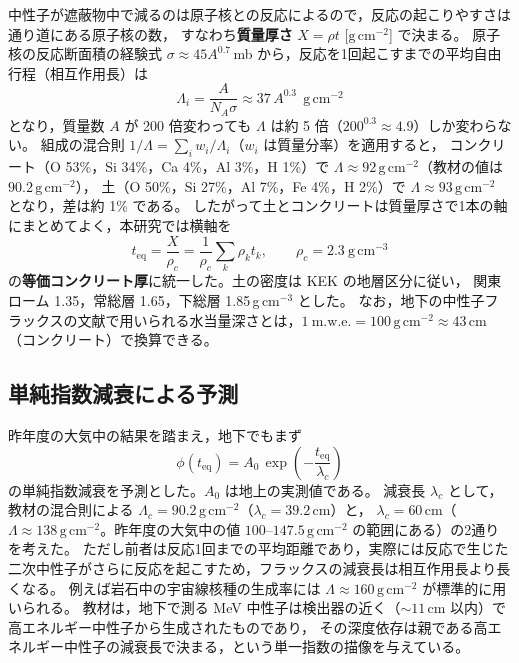 \documentclass[a4paper,11pt]{ltjsarticle}
\newcommand{\teq}{t_{\mathrm{eq}}}
\newcommand{\gcm}{\mathrm{g\,cm^{-2}}}
\begin{document}
中性子が遮蔽物中で減るのは原子核との反応によるので，反応の起こりやすさは通り道にある原子核の数，
すなわち\textbf{質量厚さ} $X=\rho t$ [$\gcm$] で決まる。
原子核の反応断面積の経験式 $\sigma\approx45A^{0.7}$\,mb から，反応を1回起こすまでの平均自由行程（相互作用長）は
\begin{equation}
  \Lambda_i = \frac{A}{N_A\sigma} \approx 37\,A^{0.3}\ \ \gcm
\end{equation}
となり，質量数 $A$ が 200 倍変わっても $\Lambda$ は約 5 倍（$200^{0.3}\approx4.9$）しか変わらない\cite{kyozai}。
組成の混合則 $1/\Lambda=\sum_i w_i/\Lambda_i$（$w_i$ は質量分率）を適用すると，
コンクリート（O 53\%，Si 34\%，Ca 4\%，Al 3\%，H 1\%）で $\Lambda\approx92\,\gcm$（教材の値は $90.2\,\gcm$），
土（O 50\%，Si 27\%，Al 7\%，Fe 4\%，H 2\%）で $\Lambda\approx93\,\gcm$ となり，差は約 1\% である。
したがって土とコンクリートは質量厚さで1本の軸にまとめてよく，本研究では横軸を
\begin{equation}
  \teq = \frac{X}{\rho_c} = \frac{1}{\rho_c}\sum_{k}\rho_k t_k,
  \qquad \rho_c = 2.3\ \mathrm{g\,cm^{-3}}
  \label{eq:teq}
\end{equation}
の\textbf{等価コンクリート厚}に統一した。土の密度は KEK の地層区分に従い，
関東ローム 1.35，常総層 1.65，下総層 1.85\,g\,cm$^{-3}$ とした。
なお，地下の中性子フラックスの文献\cite{FabrykaMartin1988}で用いられる水当量深さとは，$1\ \mathrm{m.w.e.}=100\,\gcm\approx43$\,cm（コンクリート）で換算できる。

\subsection{単純指数減衰による予測}

昨年度の大気中の結果を踏まえ，地下でもまず
\begin{equation}
  \phi(\teq) = A_0\,\exp\!\left(-\frac{\teq}{\lambda_c}\right)
  \label{eq:simple}
\end{equation}
の単純指数減衰を予測とした。$A_0$ は地上の実測値である。
減衰長 $\lambda_c$ として，教材の混合則による $\Lambda_c=90.2\,\gcm$（$\lambda_c=39.2$\,cm）と，
$\lambda_c=60$\,cm（$\Lambda\approx138\,\gcm$。昨年度の大気中の値 $100$--$147.5\,\gcm$ の範囲にある）の2通りを考えた。
ただし前者は反応1回までの平均距離であり，実際には反応で生じた二次中性子がさらに反応を起こすため，フラックスの減衰長は相互作用長より長くなる。
例えば岩石中の宇宙線核種の生成率には $\Lambda\approx160\,\gcm$ が標準的に用いられる\cite{Gosse2001}。
教材\cite{kyozai}は，地下で測る MeV 中性子は検出器の近く（$\sim11$\,cm 以内）で高エネルギー中性子から生成されたものであり，
その深度依存は親である高エネルギー中性子の減衰長で決まる，という単一指数の描像を与えている。
\end{document}
